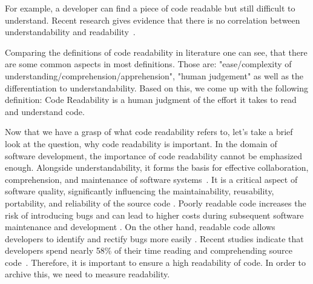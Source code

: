 \documentclass[%
class=scrreprt,
chapterprefix=false,%
open=right,%
twoside=false,%
paper=a4,%
logofile={Logo\_zentral\_farbig\_EN.png},%
thesistype=master,%
UKenglish,%
]{se2thesis}
\begin{document}
	For example, a developer can find a piece of code readable but still difficult to understand.
	Recent research gives evidence that there is no correlation between understandability and readability~\cite{scalabrino2017automatically}.	
	
	
		

	Comparing the definitions of code readability in literature one can see, that there are some common aspects in most definitions. Those are:
	"ease/complexity of understanding/comprehension/apprehension", "human judgement" as well as the differentiation to understandability.
	Based on this, we come up with the following definition:
	Code Readability is a human judgment of the effort it takes to read and understand code. %
	
	Now that we have a grasp of what code readability refers to, let's take a brief look at the question, why code readability is important.
	In the domain of software development, the importance of code readability cannot be emphasized enough. Alongside understandability, it forms the basis for effective collaboration, comprehension, and maintenance of software systems~\cite{posnett2011simpler, aggarwal2002integrated}.
	It is a critical aspect of software quality, significantly influencing the maintainability, reusability, portability, and reliability of the source code \cite{alawad2019empirical, sedano2016code}. Poorly readable code increases the risk of introducing bugs \cite{mannan2018towards, scalabrino2018comprehensive} and can lead to higher costs during subsequent software maintenance and development \cite{johnson2019empirical}. On the other hand, readable code allows developers to identify and rectify bugs more easily \cite{mi2023graph}.
	Recent studies indicate that developers spend nearly 58\% of their time reading and comprehending source code~\cite{buse2009learning, deimel1985uses, rugaber2000use, boehm2001defect, tashtoush2013impact, sedano2016code, xia2017measuring}.
	Therefore, it is important to ensure a high readability of code. In order to archive this, we need to measure readability.
	
\end{document}
